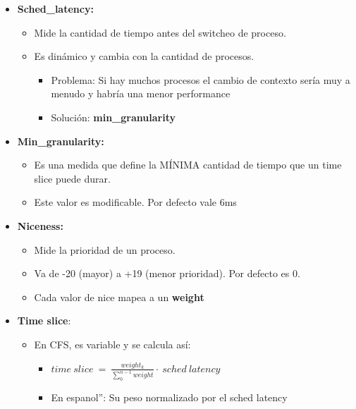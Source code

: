 \documentclass{article}
\begin{document}
\begin{itemize}
\item
  \textbf{Sched\_latency:}

  \begin{itemize}
  \item
    Mide la cantidad de tiempo antes del switcheo de proceso.
  \item
    Es dinámico y cambia con la cantidad de procesos.

    \begin{itemize}
    \item
      Problema: Si hay muchos procesos el cambio de contexto sería muy a
      menudo y habría una menor performance
    \item
      Solución: \textbf{min\_granularity}
    \end{itemize}
  \end{itemize}
\item
  \textbf{Min\_granularity:}

  \begin{itemize}
  \item
    Es una medida que define la MÍNIMA cantidad de tiempo que un time
    slice puede durar.
  \item
    Este valor es modificable. Por defecto vale 6ms
  \end{itemize}
\item
  \textbf{Niceness:}

  \begin{itemize}
  \item
    Mide la prioridad de un proceso.
  \item
    Va de -20 (mayor) a +19 (menor prioridad). Por defecto es 0.
  \item
    Cada valor de nice mapea a un \textbf{weight}
  \end{itemize}
\item
  \textbf{Time slice}:

  \begin{itemize}
  \item
    En CFS, es variable y se calcula así:

    \begin{itemize}
    \item
      \(time\ slice\  = \ \frac{weight_{k}}{\sum_{0}^{n - 1}weight} \cdot \ sched\ latency\)
    \item
      En espanol'': Su peso normalizado por el sched latency
    \end{itemize}
  \end{itemize}
\end{itemize}
\end{document}
